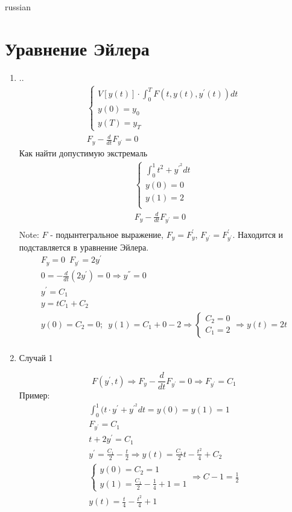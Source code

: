 \documentclass{article}
\begin{document}
\begin{otherlanguage*}{russian}
\section{\foreignlanguage{russian}{Уравнение Эйлера}}
\begin{enumerate}
\item .. 
\begin{align}
\begin{cases}
V [y(t)] \cdot \int_0^T F(t, y(t), y^{'} (t) ) dt \\
y(0) = y_0 \\
y(T) = y_T  
\end{cases} \\
F_y - \frac{d}{dt} F_{y^{'}} = 0 
\end{align}
Как найти допустимую экстремаль 
\begin{align}
\begin{cases}
\int_0^1 t^2 + y^{'^{2}} dt \\
y(0) =0 \\
y(1) = 2 \\
\end{cases} \\
F_y - \frac{d}{dt} F_{y^{'}} = 0 \\
\end{align}
Note: $ F $ -  подынтегральное выражение, $ F_y = F^{'}_y$, $ F_{y^{'}} =  F^{'}_{y^{'}}  $. Находится и подставляется в уравнение Эйлера.   
\begin{align}
F_y = 0 \,\,\, F_{y^{'}} = 2 y^{'} \\
0 = - \frac{d}{dt} (2 y ^{'}) = 0 \Rightarrow y^{''} = 0 \\
y^{'} = C_1 \\
y = t C_1 + C_2 \\ 
y(0) = C_2 = 0; \,\,\, y(1) = C_1 + 0 - 2 \Rightarrow \begin{cases}
C_2 = 0 \\
C_1 = 2 
\end{cases} \Rightarrow y(t) = 2 t \\
\end{align}
\item Случай 1 

\begin{equation}
F(y^{'}, t) \Rightarrow F_y - \frac{d}{dt} F_{y^{'}} = 0 \Rightarrow F_{y^{'}} = C_1 
\end{equation}
Пример: 
\begin{align}
\int_0^1 (t \cdot y ^{'} + y ^{'^{2}} dt = y(0) = y(1) = 1 \\
F_{y^{'}} = C_1 \\
t + 2y^{'} = C_1  \\
y^{'} = \frac{C_1}{2} - \frac{t}{2} \Rightarrow y(t) = \frac{C_1}{2} t - \frac{t^2}{4} + C_2 \\
\begin{cases}
y(0) = C_2 = 1 \\
y(1) = \frac{C_1}{2} - \frac{1}{4} + 1 = 1
\end{cases} \Rightarrow C-1 = \frac{1}{2} \\
y(t) = \frac{t}{4} - \frac{t^2}{4} + 1
\end{align}


\end{enumerate}
\end{otherlanguage*}
\end{document}
